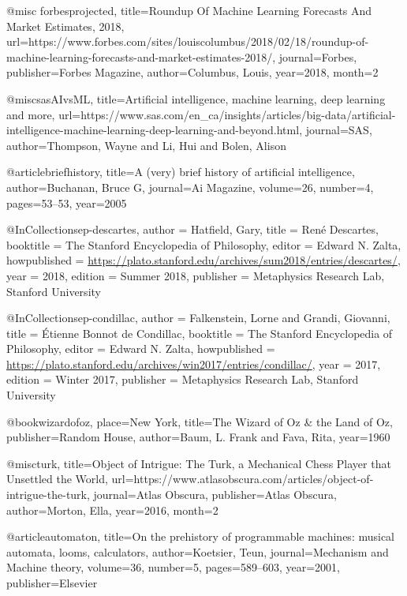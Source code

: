 @misc{  forbesprojected, 
        title={Roundup Of Machine Learning Forecasts And Market Estimates, 2018}, 
        url={https://www.forbes.com/sites/louiscolumbus/2018/02/18/roundup-of-machine-learning-forecasts-and-market-estimates-2018/}, 
        journal={Forbes}, 
        publisher={Forbes Magazine}, 
        author={Columbus, Louis}, 
        year=2018, 
        month=2
}

@misc{sasAIvsML, title={Artificial intelligence, machine learning, deep learning and more}, url={https://www.sas.com/en_ca/insights/articles/big-data/artificial-intelligence-machine-learning-deep-learning-and-beyond.html}, journal={SAS}, author={Thompson, Wayne and Li, Hui and Bolen, Alison}}

@article{briefhistory,
  title={A (very) brief history of artificial intelligence},
  author={Buchanan, Bruce G},
  journal={Ai Magazine},
  volume={26},
  number={4},
  pages={53--53},
  year={2005}
}

@InCollection{sep-descartes,
	author       =	{Hatfield, Gary},
	title        =	{René Descartes},
	booktitle    =	{The Stanford Encyclopedia of Philosophy},
	editor       =	{Edward N. Zalta},
	howpublished =	{\url{https://plato.stanford.edu/archives/sum2018/entries/descartes/}},
	year         =	{2018},
	edition      =	{Summer 2018},
	publisher    =	{Metaphysics Research Lab, Stanford University}
}

@InCollection{sep-condillac,
	author       =	{Falkenstein, Lorne and Grandi, Giovanni},
	title        =	{Étienne Bonnot de Condillac},
	booktitle    =	{The Stanford Encyclopedia of Philosophy},
	editor       =	{Edward N. Zalta},
	howpublished =	{\url{https://plato.stanford.edu/archives/win2017/entries/condillac/}},
	year         =	{2017},
	edition      =	{Winter 2017},
	publisher    =	{Metaphysics Research Lab, Stanford University}
}

@book{wizardofoz, place={New York}, title={The Wizard of Oz \& the Land of Oz}, publisher={Random House}, author={Baum, L. Frank and Fava, Rita}, year={1960}} 

@misc{turk, title={Object of Intrigue: The Turk, a Mechanical Chess Player that Unsettled the World}, url={https://www.atlasobscura.com/articles/object-of-intrigue-the-turk}, journal={Atlas Obscura}, publisher={Atlas Obscura}, author={Morton, Ella}, year={2016}, month=2} 

@article{automaton,
  title={On the prehistory of programmable machines: musical automata, looms, calculators},
  author={Koetsier, Teun},
  journal={Mechanism and Machine theory},
  volume={36},
  number={5},
  pages={589--603},
  year={2001},
  publisher={Elsevier}
}

